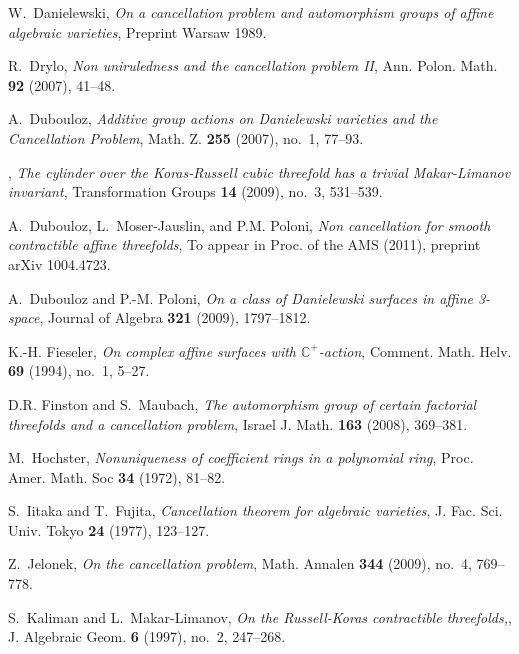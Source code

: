\documentclass[10pt,oneside,english]{amsart}
\numberwithin{equation}{section}
\numberwithin{figure}{section}
\theoremstyle{plain}
\theoremstyle{remark}
\theoremstyle{plain}
\theoremstyle{plain}
\theoremstyle{definition}
\begin{document}

\begin{thebibliography}{10}

W.~Danielewski, \emph{On a cancellation problem and automorphism groups of
  affine algebraic varieties}, Preprint {W}arsaw 1989.

R.~Drylo, \emph{Non uniruledness and the cancellation problem {II}}, Ann.
  Polon. Math. \textbf{92} (2007), 41--48.

A.~Dubouloz, \emph{Additive group actions on {D}anielewski varieties and the
  {C}ancellation {P}roblem}, Math. Z. \textbf{255} (2007), no.~1, 77--93.

\bysame, \emph{The cylinder over the {K}oras-{R}ussell cubic threefold has a
  trivial {M}akar-{L}imanov invariant}, Transformation Groups \textbf{14}
  (2009), no.~3, 531--539.

A.~Dubouloz, L.~Moser-Jauslin, and P.M. Poloni, \emph{Non cancellation for
  smooth contractible affine threefolds}, To appear in Proc. of the AMS (2011),
  preprint arXiv 1004.4723.

A.~Dubouloz and P.-M. Poloni, \emph{On a class of {D}anielewski surfaces in
  affine 3-space}, Journal of Algebra \textbf{321} (2009), 1797--1812.

K.-H. Fieseler, \emph{On complex affine surfaces with $\mathbb{C}^+$-action},
  Comment. Math. Helv. \textbf{69} (1994), no.~1, 5--27.

D.R. Finston and S.~Maubach, \emph{The automorphism group of certain factorial
  threefolds and a cancellation problem}, Israel J. Math. \textbf{163} (2008),
  369--381.

M.~Hochster, \emph{Nonuniqueness of coefficient rings in a polynomial ring},
  Proc. Amer. Math. Soc \textbf{34} (1972), 81--82.

S.~Iitaka and T.~Fujita, \emph{Cancellation theorem for algebraic varieties},
  J. {F}ac. {S}ci. {U}niv. {T}okyo \textbf{24} (1977), 123--127.

Z.~Jelonek, \emph{On the cancellation problem}, Math. Annalen \textbf{344}
  (2009), no.~4, 769--778.

S.~Kaliman and L.~Makar-Limanov, \emph{On the {R}ussell-{K}oras contractible
  threefolds,}, J. Algebraic Geom. \textbf{6} (1997), no.~2, 247--268.


\end{thebibliography}
\end{document}
